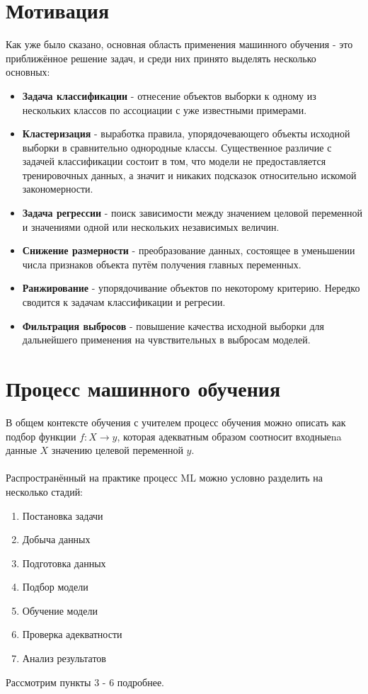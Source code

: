\documentclass{article}
\begin{document}
\section*{Мотивация}
    Как уже было сказано, основная область применения машинного обучения - это приближённое решение задач, и среди них принято выделять несколько основных:
    \begin{itemize}
        \item \textbf{Задача классификации} - отнесение объектов выборки к одному из нескольких классов по ассоциации с уже известными примерами.
        \item \textbf{Кластеризация} - выработка правила, упорядочевающего объекты исходной выборки в сравнительно однородные классы. Существенное различие с задачей классификации состоит в том, что модели не предоставляется тренировочных данных, а значит и никаких подсказок относительно искомой закономерности.
        \item \textbf{Задача регрессии} - поиск зависимости между значением целовой переменной и значениями одной или нескольких независимых величин.
        \item \textbf{Снижение размерности} - преобразование данных, состоящее в уменьшении числа признаков объекта путём получения главных переменных.
        \item \textbf{Ранжирование} - упорядочивание объектов по некоторому критерию. Нередко сводится к задачам классификации и регресии.
        \item \textbf{Фильтрация выбросов} - повышение качества исходной выборки для дальнейшего применения на чувствительных в выбросам моделей.
        
    \end{itemize}

\section*{Процесс машинного обучения}
    В общем контексте обучения с учителем процесс обучения можно описать как подбор функции  $f:X \rightarrow y$, которая адекватным образом соотносит входныеna данные $X$ значению целевой переменной $y$. \\
    \\
    Распространённый на практике процесс ML можно условно разделить на несколько стадий: 
    \begin{enumerate}
        \item Постановка задачи
        \item Добыча данных
        \item Подготовка данных 
        \item Подбор модели
        \item Обучение модели
        \item Проверка адекватности
        \item Анализ результатов
    \end{enumerate}
    Рассмотрим пункты 3 - 6 подробнее.
\end{document}
